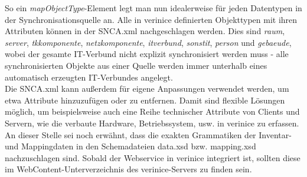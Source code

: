 \documentclass[a4paper,10pt]{book}
\begin{document}
So ein \textit{mapObjectType}-Element legt man nun idealerweise für jeden Datentypen in der Synchronisationsquelle
an. Alle in verinice definierten Objekttypen mit ihren Attributen können in der SNCA.xml nachgeschlagen werden. Dies sind
\textit{raum}, \textit{server}, \textit{tkkomponente}, \textit{netzkomponente}, \textit{itverbund}, \textit{sonstit},
\textit{person} und \textit{gebaeude}, wobei der gesamte IT-Verbund nicht explizit synchronisiert werden muss - alle
synchronisierten Objekte aus einer Quelle werden immer unterhalb eines automatisch erzeugten IT-Verbundes angelegt.
\newline\\
Die SNCA.xml kann außerdem für eigene Anpassungen verwendet werden, um etwa Attribute hinzuzufügen oder zu entfernen. Damit sind
flexible Lösungen möglich, um beispielsweise auch eine Reihe technischer Attribute von Clients und Servern, wie
die verbaute Hardware, Betriebssystem, usw. in verinice zu erfassen.
\newline\\
An dieser Stelle sei noch erwähnt, dass die exakten Grammatiken der Inventar- und Mappingdaten in den Schemadateien
data.xsd bzw. mapping.xsd nachzuschlagen sind. Sobald der Webservice in verinice integriert ist,
sollten diese im WebContent-Unterverzeichnis des verinice-Servers zu finden sein.
\end{document}
